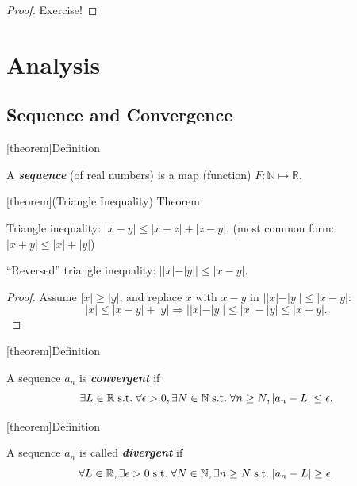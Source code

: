 \documentclass[12pt]{report}
\theoremstyle{definition}
\begin{document}
\begin{proof}
    Exercise!
\end{proof}









\chapter{Analysis}

\section{Sequence and Convergence}

[theorem]{Definition}
\begin{sequence}
    A \textbf{\emph{sequence}} (of real numbers) is a map (function) $F: \mathbb{N} \mapsto \mathbb{R}$.
\end{sequence}

[theorem]{(Triangle Inequality) Theorem}
\begin{triangle inequality}
    Triangle inequality: $|x-y| \le |x-z| + |z-y|$. (most common form: $|x+y| \le |x| + |y|$)

    ``Reversed'' triangle inequality: $||x|-|y|| \le |x-y|$.
\end{triangle inequality}

\begin{proof}
    Assume $|x| \ge |y|$, and replace $x$ with $x - y$ in $||x|-|y|| \le |x-y|$:\[
        |x| \le |x-y|+|y| \Rightarrow{}||x|-|y|| \le |x|-|y| \le |x-y|.
    \]
\end{proof}

[theorem]{Definition}
\begin{convergent sequences}
    A sequence $a_n$ is \textbf{\emph{convergent}} if \[
        \exists L \in \mathbb{R} \;\textnormal{s.t.}\; \forall \epsilon > 0,
        \exists N \in \mathbb{N} \;\textnormal{s.t.}\; \forall n \ge N, |a_n - L| \le \epsilon.
    \]
\end{convergent sequences}

[theorem]{Definition}
\begin{divergent sequences}
    A sequence $a_n$ is called \textbf{\emph{divergent}} if\[
        \forall L \in \mathbb{R}, \exists \epsilon > 0 \;\textnormal{s.t.}\;
        \forall N \in \mathbb{N}, \exists n \ge N \;\textnormal{s.t.}\; |a_n - L| \ge \epsilon.
    \]
\end{divergent sequences}
\end{document}
